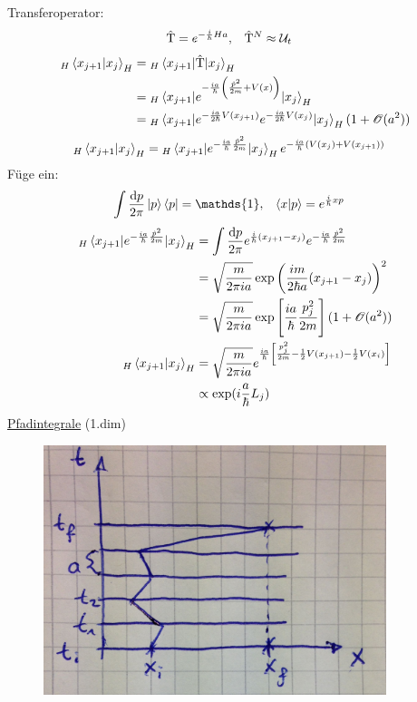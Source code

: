 Transferoperator:
	\begin{align*}
		\hat{\mathrm{T}} &= e^{-\frac{i}{\hbar} H a} ,&
		\hat{\mathrm{T}}^N &\approx \mathcal{U}_t
	\end{align*}
	\begin{align*}
		_H\braket{x_{j+1} | x_j}_H &= {}_H\braket{x_{j+1}| \hat{\mathrm{T}} | x_j}_H \\
		&= {}_H \braket{x_{j+1} | e^{-\frac{ia}{\hbar} \left(\frac{\hat{p}^2}{2m} + V(x)\right)} | x_j}_H \\
		&= {}_H \braket{x_{j+1} | e^{-\frac{ia}{2\hbar} V(x_{j+1})} e^{-\frac{ia}{2\hbar}V(x_j)} | x_j}_H (1 + \mathscr{O}(a^2))
	\end{align*}
	\begin{align*}
		_H\braket{x_{j+1} | x_j}_H &=
		{}_H\braket{x_{j+1} | e^{-\frac{ia}{\hbar} \frac{\hat{p}^2}{2m}} | x_j}_H
		e^{-\frac{ia}{\hbar} \left(V(x_j) + V(x_{j + 1})\right)}
	\end{align*}
Füge ein:
	\begin{align*}
		\int \frac{\diff p}{2 \pi} \ket{p} \bra{p} &= \mathds{1} ,& 
		\braket{x | p} &= e^{\frac{i}{\hbar} xp}
	\end{align*}
	\begin{align*}
		_H\braket{x_{j+1} | e^{-\frac{ia}{\hbar} \frac{\hat{p}^2}{2m}}| x_j}_H
		&= \int \frac{\mathrm{d} p}{2 \pi} e^{\frac{i}{\hbar} (x_{j+1} - x_j)}  e^{-\frac{ia}{\hbar} \frac{\hat{p}^2}{2m}} \\
		&= \sqrt{\frac{m}{2 \pi i a}} \exp\left(\frac{im}{2 \hbar a} (x_{j+1} - x_j)\right)^2 \\
		&= \sqrt{\frac{m}{2 \pi i a}} \exp\left[\frac{ia}{\hbar} \frac{p_j^2}{2m}\right]
		(1 + \mathscr{O}(a^2)) \\
		_H\braket{x_{j+1} | x_j}_H &=
		\sqrt{\frac{m}{2 \pi i a}} e^{\frac{ia}{\hbar} \left[\frac{p_j^2}{2m} - \frac{1}{2} V(x_{j+1}) - \frac{1}{2} V(x_i)\right]} \\
		&\propto \exp (i \frac{a}{\hbar} L_j)
	\end{align*}
\underline{Pfadintegrale} (1.dim) 
	\begin{figure} [h]
		\begin{center}
			\includegraphics[width=10cm]{Uebergangsamplituden2}
		\end{center}
	\end{figure}
\FloatBarrier
